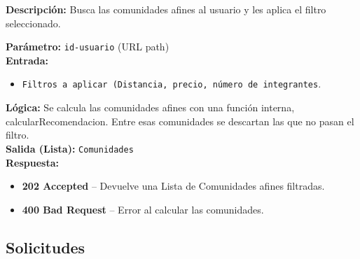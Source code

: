 \begin{tcolorbox}[title=\texttt{GET /usuarios/\{id-usuario\}/recomendaciones/filtrado}, colback=blue!5, colframe=blue!80!black]
\textbf{Descripción:} Busca las comunidades afines al usuario y les aplica el filtro seleccionado.

\textbf{Parámetro:} \texttt{id-usuario} (URL path) \\
\textbf{Entrada:}
\begin{itemize}[label=--]
    \item \texttt{Filtros a aplicar (Distancia, precio, número de integrantes}.
\end{itemize}
\textbf{Lógica:}
Se calcula las comunidades afines con una función interna, calcularRecomendacion. Entre esas comunidades se descartan las que no pasan el filtro.\\
\textbf{Salida (Lista):} \texttt{Comunidades}\\
\textbf{Respuesta:}
\begin{itemize}[label=--]
    \item \textbf{202 Accepted} – Devuelve una Lista de Comunidades afines filtradas.
    \item \textbf{400 Bad Request} – Error al calcular las comunidades.
\end{itemize}
\end{tcolorbox}

\subsection{Solicitudes}

